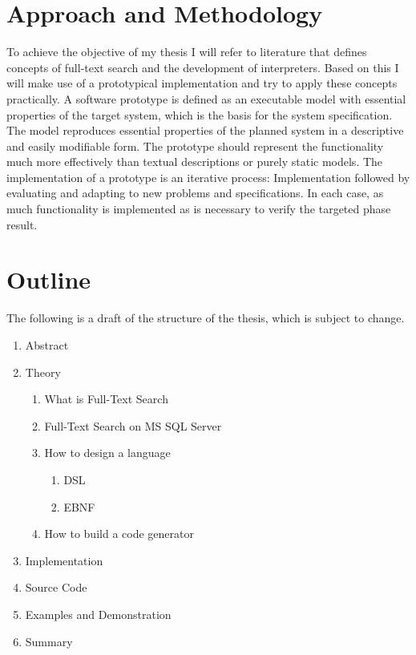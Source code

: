 \section{Approach and Methodology}
To achieve the objective of my thesis I will refer to literature that defines concepts of full-text search and the development of interpreters. Based on this I will make use of a prototypical implementation and try to apply these concepts practically. A software prototype is defined as an executable model with essential properties of the target system, which is the basis for the system specification. The model reproduces essential properties of the planned system in a descriptive and easily modifiable form. The prototype should represent the functionality much more effectively than textual descriptions or purely static models. \parencite[cf.][]{connell_structured_1989} The implementation of a prototype is an iterative process: Implementation followed by evaluating and adapting to new problems and specifications. In each case, as much functionality is implemented as is necessary to verify the targeted phase result. \parencite[cf.][p. 3]{pomberger_methoden_1992}
\newpage
\section{Outline}
The following is a draft of the structure of the thesis, which is subject to change.
\begin{enumerate}[noitemsep]
    \item Abstract
    \item Theory
    \begin{enumerate}[noitemsep]
        \item What is Full-Text Search
        \item Full-Text Search on MS SQL Server
        \item How to design a language
        \begin{enumerate}[noitemsep]
            \item DSL
            \item EBNF
        \end{enumerate}
        \item How to build a code generator
    \end{enumerate}
    \item Implementation
    \item Source Code
    \item Examples and Demonstration
    \item Summary
\end{enumerate}
\newpage
